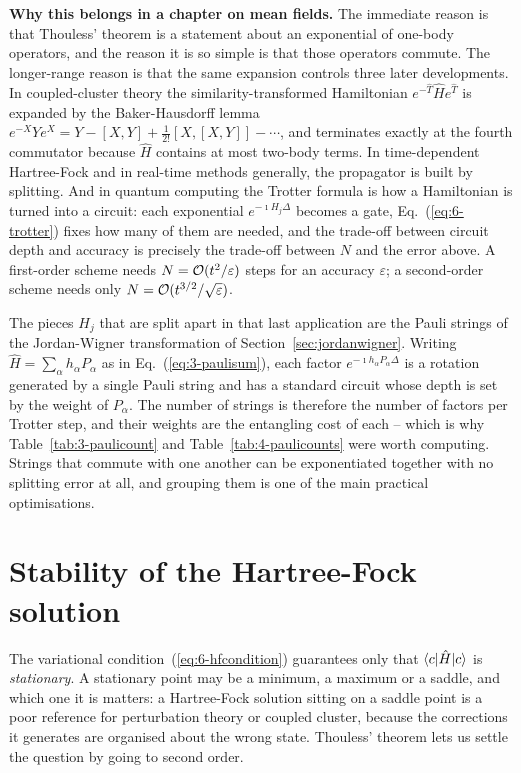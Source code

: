 \begin{notebox}
\textbf{Why this belongs in a chapter on mean fields.}  The immediate reason
is that Thouless' theorem is a statement about an exponential of one-body
operators, and the reason it is so simple is that those operators commute.
The longer-range reason is that the same expansion controls three later
developments.  In coupled-cluster theory the similarity-transformed
Hamiltonian $e^{-\hat{T}}\hat{H}e^{\hat{T}}$ is expanded by the
Baker-Hausdorff lemma
$e^{-X}Ye^{X}=Y-[X,Y]+\tfrac1{2!}[X,[X,Y]]-\cdots$, and terminates exactly at
the fourth commutator because $\hat{H}$ contains at most two-body terms.  In
time-dependent Hartree-Fock and in real-time methods generally, the propagator
is built by splitting.  And in quantum computing the Trotter formula is how a
Hamiltonian is turned into a circuit: each exponential
$e^{-\imath H_j\Delta}$ becomes a gate, Eq.~(\ref{eq:6-trotter}) fixes how
many of them are needed, and the trade-off between circuit depth and
accuracy is precisely the trade-off between $N$ and the error above.  A
first-order scheme needs $N=\mathcal{O}(t^2/\varepsilon)$ steps for an accuracy
$\varepsilon$; a second-order scheme needs only
$N=\mathcal{O}(t^{3/2}/\sqrt{\varepsilon})$.

The pieces $H_j$ that are split apart in that last application are the Pauli
strings of the Jordan-Wigner transformation of
Section~\ref{sec:jordanwigner}.  Writing $\hat{H}=\sum_{\alpha}h_{\alpha}
P_{\alpha}$ as in Eq.~(\ref{eq:3-paulisum}), each factor
$e^{-\imath h_{\alpha}P_{\alpha}\Delta}$ is a rotation generated by a single
Pauli string and has a standard circuit whose depth is set by the weight of
$P_{\alpha}$.  The number of strings is therefore the number of factors per
Trotter step, and their weights are the entangling cost of each -- which is
why Table~\ref{tab:3-paulicount} and Table~\ref{tab:4-paulicounts} were worth
computing.  Strings that commute with one another can be exponentiated
together with no splitting error at all, and grouping them is one of the main
practical optimisations.
\end{notebox}

\section{Stability of the Hartree-Fock solution}
\label{sec:hfstability}

The variational condition~(\ref{eq:6-hfcondition}) guarantees only that
$\langle c | \hat{H} | c \rangle$ is \emph{stationary}.  A stationary point may be a
minimum, a maximum or a saddle, and which one it is matters: a Hartree-Fock
solution sitting on a saddle point is a poor reference for perturbation theory
or coupled cluster, because the corrections it generates are organised about
the wrong state.  Thouless' theorem lets us settle the question by going to
second order.

